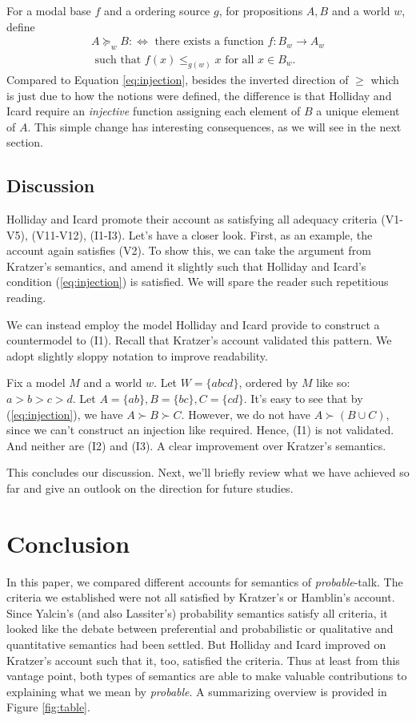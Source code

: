 \documentclass{article}
\theoremstyle{definition}
\begin{document}
For a modal base $f$ and a ordering source $g$, for propositions $A,B$ and a world $w$, define
\begin{multline}
    \tag{2*}
    \label{eq:lifted-star}
    A \succeq_w B :\iff \text{ there exists a function } f: B_w \rightarrow A_w \\ \text{ such that } f(x) \leq_{g(w)} x \text{ for all } x \in B_w.
\end{multline}
Compared to Equation \ref{eq:injection}, besides the inverted direction of $\geq$ which is just due to how the notions were defined, the difference is that Holliday and Icard require an \emph{injective} function assigning each element of $B$ a unique element of $A$.
This simple change has interesting consequences, as we will see in the next section. 
\subsection{Discussion}

Holliday and Icard promote their account as satisfying all adequacy criteria (V1-V5), (V11-V12), (I1-I3).
Let's have a closer look.
First, as an example, the account again satisfies (V2).
To show this, we can take the argument from Kratzer's semantics, and amend it slightly such that Holliday and Icard's condition (\ref{eq:injection}) is satisfied.  
We will spare the reader such repetitious reading. 

We can instead employ the model Holliday and Icard provide to construct a countermodel to (I1). Recall that Kratzer's account validated this pattern. We adopt slightly sloppy notation to improve readability.  

Fix a model $M$ and a world $w$. Let $W = \{abcd\}$, ordered by $M$ like so: $a
> b > c > d$. Let $A = \{ab\}, B = \{bc\}, C = \{cd\}$. It's easy to see that by
(\ref{eq:injection}), we have $A \succ B \succ C$. However, we do not have $A
\succ (B \cup C)$, since we can't construct an injection like required. Hence,
(I1) is not validated. And neither are (I2) and (I3). A clear improvement over
Kratzer's semantics.

This concludes our discussion. Next, we'll briefly review what we have achieved
so far and give an outlook on the direction for future studies.

\section{Conclusion}
In this paper, we compared different accounts for semantics of \emph{probable}-talk. The criteria we established were not all satisfied by Kratzer's or Hamblin's account. Since Yalcin's (and also Lassiter's) probability semantics satisfy all criteria, it looked like the debate between preferential and probabilistic or qualitative and quantitative semantics had been settled. But Holliday and Icard improved on Kratzer's account such that it, too, satisfied the criteria. Thus at least from this vantage point, both types of semantics are able to make valuable contributions to explaining what we mean by \emph{probable}.
A summarizing overview is provided in Figure \ref{fig:table}.
\end{document}

